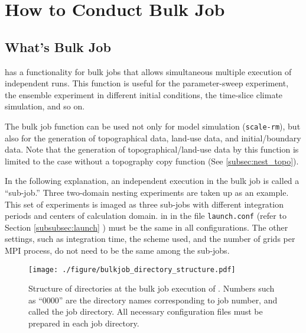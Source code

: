 \section{How to Conduct Bulk Job} \label{sec:bulkjob}

\subsection{What's Bulk Job}
 \scalerm has a functionality for bulk jobs that allows simultaneous multiple execution of independent runs.
This function is useful for the parameter-sweep experiment, the ensemble experiment in different initial conditions, the time-slice climate simulation, and so on.

The bulk job function can be used not only for model simulation (\verb|scale-rm|), but also for the generation of topographical data, land-use data, and initial/boundary data. Note that the generation of topographical/land-use data by this function is limited to the case without a topography copy function (See \ref{subsec:nest_topo}).

In the following explanation, an independent execution in the bulk job is called a ``sub-job.'' Three two-domain nesting experiments are taken up as an example. This set of experiments is imaged as three sub-jobs with different integration periods and centers of calculation domain.  in  in the file \verb|launch.conf| (refer to Section \ref{subsubsec:launch} ) must be the same in all configurations. The other settings, such as integration time, the scheme used, and the number of grids per MPI process, do not need to be the same among the sub-jobs.

\begin{figure}[t]
\begin{center}
  \texttt{[image: ./figure/bulkjob\_directory\_structure.pdf]}\\
  \caption{Structure of directories at the bulk job execution of \scalerm.
Numbers such as ``0000'' are the directory names corresponding to job number, and called the job directory.   All necessary configuration files must be prepared in each job directory.
}
  \label{fig_bulkjob}
\end{center}
\end{figure}



